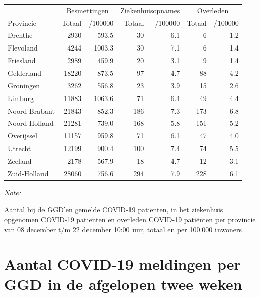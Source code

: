 \documentclass[
  english,
  man,floatsintext]{apa6}
\begin{document}
\begin{table}[H]
\centering
\begin{threeparttable}
\begin{tabular}{lrrrrrr}
\toprule
\multicolumn{1}{c}{ } & \multicolumn{2}{c}{Besmettingen} & \multicolumn{2}{c}{Ziekenhuisopnames} & \multicolumn{2}{c}{Overleden} \\
\cmidrule(l{3pt}r{3pt}){2-3} \cmidrule(l{3pt}r{3pt}){4-5} \cmidrule(l{3pt}r{3pt}){6-7}
Provincie & Totaal & /100000 & Totaal & /100000 & Totaal & /100000\\
\midrule
Drenthe & 2930 & 593.5 & 30 & 6.1 & 6 & 1.2\\
Flevoland & 4244 & 1003.3 & 30 & 7.1 & 6 & 1.4\\
Friesland & 2989 & 459.9 & 20 & 3.1 & 9 & 1.4\\
Gelderland & 18220 & 873.5 & 97 & 4.7 & 88 & 4.2\\
Groningen & 3262 & 556.8 & 23 & 3.9 & 15 & 2.6\\
Limburg & 11883 & 1063.6 & 71 & 6.4 & 49 & 4.4\\
Noord-Brabant & 21843 & 852.3 & 186 & 7.3 & 173 & 6.8\\
Noord-Holland & 21281 & 739.0 & 168 & 5.8 & 151 & 5.2\\
Overijssel & 11157 & 959.8 & 71 & 6.1 & 47 & 4.0\\
Utrecht & 12199 & 900.4 & 100 & 7.4 & 74 & 5.5\\
Zeeland & 2178 & 567.9 & 18 & 4.7 & 12 & 3.1\\
Zuid-Holland & 28060 & 756.6 & 294 & 7.9 & 228 & 6.1\\
\bottomrule
\end{tabular}
\begin{tablenotes}
\item \textit{Note: } 
\item Aantal bij de GGD’en gemelde COVID-19 patiënten, in het ziekenhuis opgenomen COVID-19 patiënten en overleden COVID-19 patiënten per provincie van 08 december t/m 22 december 10:00 uur, totaal en per 100.000 inwoners
\end{tablenotes}
\end{threeparttable}
\end{table}

\newpage

\hypertarget{aantal-covid-19-meldingen-per-ggd-in-de-afgelopen-twee-weken}{%
\section{Aantal COVID-19 meldingen per GGD in de afgelopen twee weken}\label{aantal-covid-19-meldingen-per-ggd-in-de-afgelopen-twee-weken}}
\end{document}
